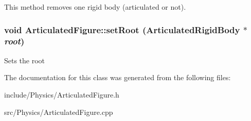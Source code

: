 \label{classCartWheel_1_1Physics_1_1ArticulatedFigure_ab21efa212cafec6ed5d1ae47bae2c059}
This method removes one rigid body (articulated or not). \hypertarget{classCartWheel_1_1Physics_1_1ArticulatedFigure_a61090487a9da17a8eae1060e9bb817f9}{
\subsubsection[{setRoot}]{\setlength{\rightskip}{0pt plus 5cm}void ArticulatedFigure::setRoot ({\bf ArticulatedRigidBody} $\ast$ {\em root})}}
\label{classCartWheel_1_1Physics_1_1ArticulatedFigure_a61090487a9da17a8eae1060e9bb817f9}
Sets the root 

The documentation for this class was generated from the following files:\begin{DoxyCompactItemize}
\item 
include/Physics/ArticulatedFigure.h\item 
src/Physics/ArticulatedFigure.cpp\end{DoxyCompactItemize}
